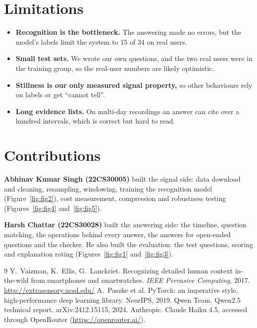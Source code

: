\documentclass[11pt,a4paper]{article}
\begin{document}
\section{Limitations}
\begin{itemize}
  \item \textbf{Recognition is the bottleneck.} The answering made no errors, but the model's labels limit the system to 15 of 34 on real users.
  \item \textbf{Small test sets.} We wrote our own questions, and the two real users were in the training group, so the real-user numbers are likely optimistic.
  \item \textbf{Stillness is our only measured signal property,} so other behaviours rely on labels or get ``cannot tell''.
  \item \textbf{Long evidence lists.} On multi-day recordings an answer can cite over a hundred intervals, which is correct but hard to read.
\end{itemize}

\section{Contributions}
\textbf{Abhinav Kumar Singh (22CS30005)} built the signal side: data download and cleaning, resampling, windowing, training the recognition model (Figure~\ref{fig:fig2}), cost measurement, compression and robustness testing (Figures~\ref{fig:fig4} and~\ref{fig:fig5}).

\noindent\textbf{Harsh Chattar (22CS30028)} built the answering side: the timeline, question matching, the operations behind every answer, the answers for open-ended questions and the checker. He also built the evaluation: the test questions, scoring and explanation rating (Figures~\ref{fig:fig1} and~\ref{fig:fig3}).
\begin{thebibliography}{9}\small
{} Y.~Vaizman, K.~Ellis, G.~Lanckriet. Recognizing detailed human context in-the-wild from smartphones and smartwatches. \emph{IEEE Pervasive Computing}, 2017. \url{http://extrasensory.ucsd.edu/}
 A.~Paszke et al. PyTorch: an imperative style, high-performance deep learning library. NeurIPS, 2019.
 Qwen Team. Qwen2.5 technical report. arXiv:2412.15115, 2024.
 Anthropic. Claude Haiku 4.5, accessed through OpenRouter (\url{https://openrouter.ai/}).
\end{thebibliography}
\end{document}
